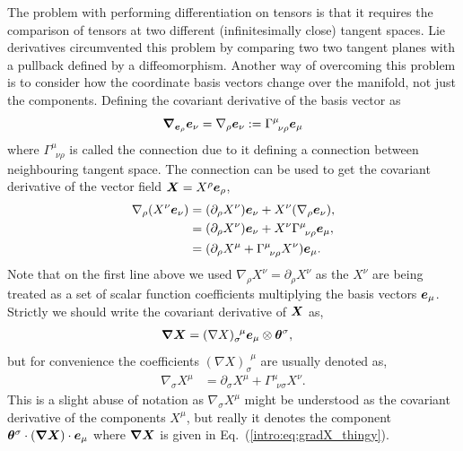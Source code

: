 The problem with performing differentiation on tensors is that it requires the comparison of tensors at two different (infinitesimally close) tangent spaces. Lie derivatives circumvented this problem by comparing two two tangent planes with a pullback defined by a diffeomorphism. Another way of overcoming this problem is to consider how the coordinate basis vectors change over the manifold, not just the components. Defining the covariant derivative of the basis vector as
\begin{equation}
\boldsymbol{\nabla}_{\boldsymbol{e}_\rho} \boldsymbol{e}_\nu = \nabla_\rho \boldsymbol{e}_\nu := \Gamma^\mu_{\,\,\,\nu\rho}\boldsymbol{e}_\mu
\end{equation}
where $\Gamma^\mu_{\,\,\,\nu\rho}$ is called the connection due to it defining a connection between neighbouring tangent space. The connection can be used to get the covariant derivative of the vector field $\boldsymbol{X}=X^\rho \boldsymbol{e}_\rho$,
\begin{align}
\nabla_\rho (X^\nu \boldsymbol{e}_\nu) &= (\partial_\rho X^\nu )\boldsymbol{e}_\nu + X^\nu (\nabla_\rho \boldsymbol{e}_\nu),\\
&= (\partial_\rho X^\nu )\boldsymbol{e}_\nu + X^\nu \Gamma^\mu_{\,\,\,\nu\rho}\boldsymbol{e}_\mu,\\
&= (\partial_\rho X^\mu + \Gamma^\mu_{\,\,\,\nu\rho} X^\nu )\boldsymbol{e}_\mu.
\end{align}
Note that on the first line above we used $\nabla_\rho X^\nu=\partial_\rho X^\nu$ as the $X^\nu$ are being treated as a set of scalar function coefficients multiplying the basis vectors $\boldsymbol{e}_\mu$. Strictly we should write the covariant derivative of $\boldsymbol{X}$ as, 
\begin{align}\label{intro:eq:gradX_thingy}
\boldsymbol{\nabla X} &= (\nabla X)^{\,\,\,\mu}_\sigma \boldsymbol{e}_\mu \otimes \boldsymbol{\theta}^\sigma, 
\end{align}
but for convenience the coefficients $(\nabla X)^{\,\,\,\mu}_\sigma$ are usually denoted as, 
\begin{align}
{\nabla}_{\sigma} X^\mu &= \partial_\sigma X^\mu + \Gamma^\mu_{\,\,\,\nu\sigma} X^\nu.
\end{align}
This is a slight abuse of notation as $\nabla_\sigma X^\mu$ might be understood as the covariant derivative of the components $X^\mu$, but really it denotes the component $\boldsymbol{\theta}^\sigma\cdot(\boldsymbol{\nabla X})\cdot \boldsymbol{e}_\mu$ where $\boldsymbol{\nabla X}$ is given in Eq.~(\ref{intro:eq:gradX_thingy}).

